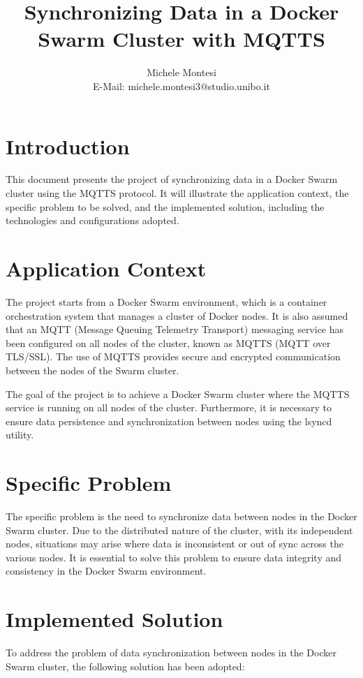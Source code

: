 \documentclass{article}
\title{Synchronizing Data in a Docker Swarm Cluster with MQTTS}
\author{Michele Montesi \\
        E-Mail: michele.montesi3@studio.unibo.it}
\begin{document}
\maketitle

\section{Introduction}
This document presents the project of synchronizing data in a Docker Swarm 
cluster using the MQTTS protocol. It will illustrate the application context, 
the specific problem to be solved, and the implemented solution, including the 
technologies and configurations adopted.

\section{Application Context}
The project starts from a Docker Swarm environment, which is a container 
orchestration system that manages a cluster of Docker nodes. It is also assumed 
that an MQTT (Message Queuing Telemetry Transport) messaging service has been configured 
on all nodes of the cluster, known as MQTTS (MQTT over TLS/SSL). The use of MQTTS provides 
secure and encrypted communication between the nodes of the Swarm cluster.

The goal of the project is to achieve a Docker Swarm cluster where the MQTTS service 
is running on all nodes of the cluster. Furthermore, it is necessary to ensure data 
persistence and synchronization between nodes using the lsyncd utility.

\section{Specific Problem}
The specific problem is the need to synchronize data between nodes in the Docker 
Swarm cluster. Due to the distributed nature of the cluster, with its independent nodes, 
situations may arise where data is inconsistent or out of sync across the various nodes. 
It is essential to solve this problem to ensure data integrity and consistency in the 
Docker Swarm environment.

\section{Implemented Solution}
To address the problem of data synchronization between nodes in the Docker Swarm cluster, 
the following solution has been adopted:
\end{document}

